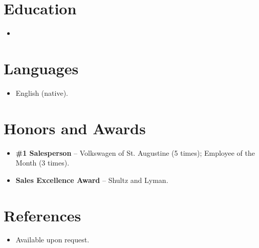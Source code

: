 \documentclass[11pt,a4paper,sans]{moderncv}
\begin{document}
\section{Education}
\vspace{1pt}
\begin{itemize}

\item{}

\end{itemize}


\section{Languages}
\vspace{1pt}
\begin{itemize}
\item English (native).
\end{itemize}


\section{Honors and Awards}
\vspace{1pt}
\begin{itemize}
\item{\textbf{\#1 Salesperson} -- Volkswagen of St. Augustine (5 times); Employee of the Month (3 times).}
\item{\textbf{Sales Excellence Award} -- Shultz and Lyman.}
\end{itemize}


\section{References}
\vspace{1pt}
\begin{itemize}
\item{Available upon request.}
\end{itemize}
\end{document}
